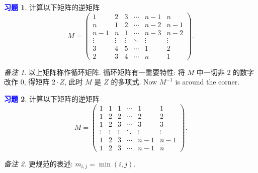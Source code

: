 \documentclass[11pt]{ctexart}
\theoremstyle{definition}
\numberwithin{equation}{section}
\theoremstyle{definition}
\newtheorem{exercise}{\textcolor{blue}{习题}}
\theoremstyle{remark}
\newtheorem*{remark}{备注}
\begin{document}
\begin{exercise}
    计算以下矩阵的逆矩阵
    \begin{equation}
        M=\begin{pmatrix}
            1 & 2 & 3 & \cdots  & n-1 & n\\
            n & 1 & 2 & \cdots  & n-2 & n-1\\
            n-1 & n & 1 & \cdots  & n-3 & n-2\\
            \vdots  & \vdots  & \vdots  & \ddots  & \vdots  & \vdots \\
            3 & 4 & 5 & \cdots  & 1 & 2\\
            2 & 3 & 4 & \cdots  & n & 1
            \end{pmatrix}.
    \end{equation}
\end{exercise}

\begin{remark}
    以上矩阵称作循环矩阵. 循环矩阵有一重要特性: 将 $M$ 中一切非 $2$ 的数字改作 $0$, 得矩阵 $2\cdot Z$, 此时 $M$ 是 $Z$ 的多项式. Now $M^{-1}$ is around the corner. 
\end{remark}


\begin{exercise}
    计算以下矩阵的逆矩阵 
    \begin{equation}
        M=\begin{pmatrix}
            1 & 1 & 1 & \cdots  & 1 & 1\\
            1 & 2 & 2 & \cdots  & 2 & 2\\
            1 & 2 & 3 & \cdots  & 3 & 3\\
            \vdots  & \vdots  & \vdots  & \ddots  & \vdots  & \vdots \\
            1 & 2 & 3 & \cdots  & n-1 & n-1\\
            1 & 2 & 3 & \cdots  & n-1 & n
            \end{pmatrix}.
    \end{equation}
\end{exercise}

\begin{remark}
    更规范的表述: $m_{i,j}=\min(i,j)$. 
\end{remark}
\end{document}
